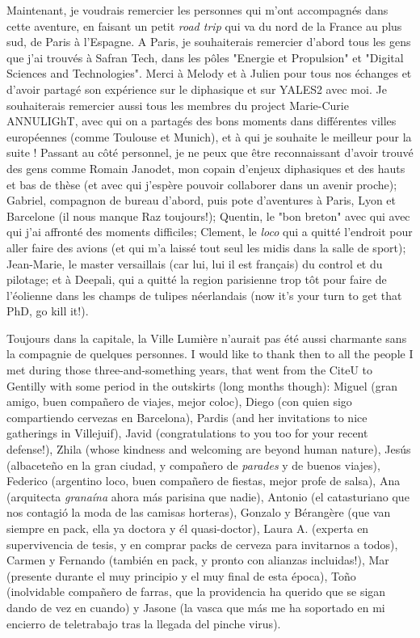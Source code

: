 Maintenant, je voudrais remercier les personnes qui m'ont accompagnés dans cette aventure, en faisant un petit \textsl{road trip} qui va du nord de la France au plus sud, de Paris à l'Espagne. A Paris, je souhaiterais remercier d'abord tous les gens que j'ai trouvés à Safran Tech, dans les pôles "Energie et Propulsion" et "Digital Sciences and Technologies". Merci à Melody et à Julien pour tous nos échanges et d'avoir partagé son expérience sur le diphasique et sur YALES2 avec moi. Je souhaiterais remercier aussi tous les membres du project Marie-Curie ANNULIGhT, avec qui on a partagés des bons moments dans différentes villes européennes (comme Toulouse et Munich), et à qui je souhaite le meilleur pour la suite ! Passant au côté personnel, je ne peux que être reconnaissant d'avoir trouvé des gens comme Romain Janodet, mon copain d'enjeux diphasiques et des hauts et bas de thèse (et avec qui j'espère pouvoir collaborer dans un avenir proche); Gabriel, compagnon de bureau d'abord, puis pote d'aventures à Paris, Lyon et Barcelone (il nous manque Raz toujours!); Quentin, le "bon breton" avec qui avec qui j'ai affronté des moments difficiles; Clement, le \textsl{loco} qui a quitté l'endroit pour aller faire des avions (et qui m'a laissé tout seul les midis dans la salle de sport); Jean-Marie, le master versaillais (car lui, lui il est français) du control et du pilotage; et à Deepali, qui a quitté la region parisienne trop tôt pour faire de l'éolienne dans les champs de tulipes néerlandais (now it's your turn to get that PhD, go kill it!).
  
Toujours dans la capitale, la Ville Lumière n'aurait pas été aussi charmante sans la compagnie de quelques personnes. I would like to thank then to all the people I met during those three-and-something years, that went from the CiteU to Gentilly with some period in the outskirts (long months though): Miguel (gran amigo, buen compañero de viajes, mejor coloc), Diego (con quien sigo compartiendo cervezas en Barcelona), Pardis (and her invitations to nice gatherings in Villejuif), Javid (congratulations to you too for your recent defense!), Zhila (whose kindness and welcoming are beyond human nature), Jesús (albaceteño en la gran ciudad, y compañero de \textsl{parades} y de buenos viajes), Federico (argentino loco, buen compañero de fiestas, mejor profe de salsa), Ana (arquitecta \textsl{granaína} ahora más parisina que nadie), Antonio (el catasturiano que nos contagió la moda de las camisas horteras), Gonzalo y Bérangère (que van siempre en pack, ella ya doctora y él quasi-doctor), Laura A. (experta en supervivencia de tesis, y en comprar packs de cerveza para invitarnos a todos), Carmen y Fernando (también en pack, y pronto con alianzas incluidas!), Mar (presente durante el muy principio y el muy final de esta época), Toño (inolvidable compañero de farras, que la providencia ha querido que se sigan dando de vez en cuando) y Jasone (la vasca que más me ha soportado en mi encierro de teletrabajo tras la llegada del pinche virus).

